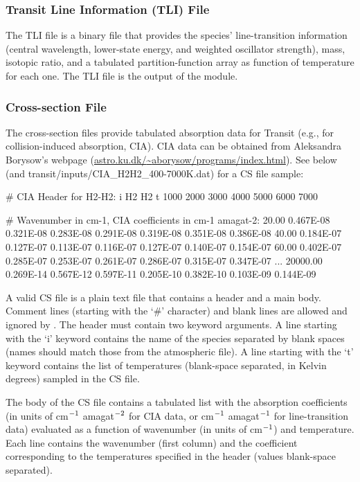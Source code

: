 \documentclass[letterpaper, 12pt]{article}
\begin{document}
\subsubsection{Transit Line Information (TLI) File}
\label{sec:TLItransit}

The TLI file is a binary file that provides the species'
line-transition information (central wavelength, lower-state energy,
and weighted oscillator strength), mass, isotopic ratio, and a
tabulated partition-function array as function of temperature for each
one.  The TLI file is the output of the {\pylineread} module.

\subsubsection{Cross-section File}

The cross-section files provide tabulated absorption data for
Transit (e.g., for collision-induced absorption, CIA).  CIA data can be obtained from Aleksandra Borysow's webpage
(\href{http://www.astro.ku.dk/~aborysow/programs/index.html}
{astro.ku.dk/{\sim}aborysow/programs/index.html}).
See below (and {\tttm
  transit/inputs/CIA\_H2H2\_400-7000K.dat}) for a CS file sample:
\newline
\begin{plain}
# CIA Header for H2-H2:
i H2 H2
t         1000      2000      3000      4000      5000      6000      7000

# Wavenumber in cm-1, CIA coefficients in cm-1 amagat-2:
   20.00  0.467E-08 0.321E-08 0.283E-08 0.291E-08 0.319E-08 0.351E-08 0.386E-08
   40.00  0.184E-07 0.127E-07 0.113E-07 0.116E-07 0.127E-07 0.140E-07 0.154E-07
   60.00  0.402E-07 0.285E-07 0.253E-07 0.261E-07 0.286E-07 0.315E-07 0.347E-07
     ...
20000.00  0.269E-14 0.567E-12 0.597E-11 0.205E-10 0.382E-10 0.103E-09 0.144E-09
\end{plain}

A valid CS file is a plain text file that contains a
header and a main body.  Comment lines (starting with the `{\tttm \#}'
character) and blank lines are allowed and ignored by {\transit}.  The
header must contain two keyword arguments.  A line starting with the
`{\tttm i}' keyword contains the name of the species separated by
blank spaces (names should match those from the atmospheric file).  A
line starting with the `{\tttm t}' keyword contains the list of
temperatures (blank-space separated, in Kelvin degrees) sampled in the
CS file.

The body of the CS file contains a tabulated list with the absorption
coefficients (in units of cm$\sp{-1}$ amagat$\sp{-2}$ for CIA data,
or cm$\sp{-1}$ amagat$\sp{-1}$ for line-transition data) evaluated as a
function of wavenumber (in units of cm$\sp{-1}$) and temperature.
Each line contains the wavenumber (first column) and the coefficient
corresponding to the temperatures specified in the header (values
blank-space separated).
\end{document}
